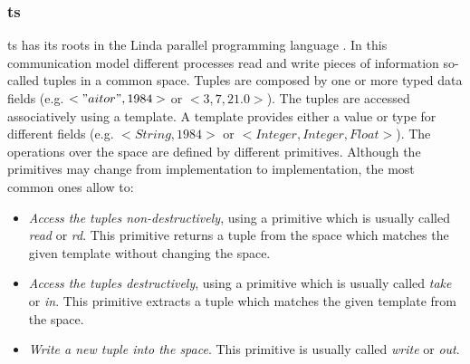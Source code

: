 \subsubsection{\acl{ts}}
\label{sec:tuplespaces_eoa}


\acf{ts} has its roots in the Linda parallel programming language \citep{gelernter_generative_1985}.
In this communication model different processes read and write pieces of information so-called tuples in a common space.
Tuples are composed by one or more typed data fields (e.g. $<"aitor",1984>$ or $<3,7,21.0>$).
The tuples are accessed associatively using a template.
A template provides either a value or type for different fields (e.g. $<String,1984>$ or $<Integer, Integer, Float>$).
The operations over the space are defined by different primitives.
Although the primitives may change from implementation to implementation, the most common ones allow to:

\begin{itemize}
  \item \emph{Access the tuples non-destructively}, using a primitive which is usually called \emph{read} or \emph{rd}.
	This primitive returns a tuple from the space which matches the given template without changing the space.
  \item \emph{Access the tuples destructively}, using a primitive which is usually called \emph{take} or \emph{in}.
	This primitive extracts a tuple which matches the given template from the space.
  \item \emph{Write a new tuple into the space}. This primitive is usually called \emph{write} or \emph{out}.
\end{itemize}